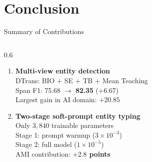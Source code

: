 \documentclass[aspectratio=169,10pt]{beamer}
\newcommand{\hg}[1]{\textcolor{dkgreen}{\textbf{#1}}}
\begin{document}
\section{Conclusion}

\begin{frame}{Summary of Contributions}
  \begin{columns}[T]
    \begin{column}{0.6\textwidth}
      \vspace{0.2em}
      \begin{enumerate}
        \setlength{\itemsep}{0.6em}
        \item \textbf{Multi-view entity detection}\\
          DTrans: BIO + SE + TB + Mean Teaching\\
          Span F1: 75.68 $\to$ \hg{82.35} ($+6.67$)\\
          Largest gain in AI domain: $+20.85$

        \item \textbf{Two-stage soft-prompt entity typing}\\
          Only $3{,}840$ trainable parameters\\
          Stage 1: prompt warmup ($3\times10^{-3}$)\\
          Stage 2: full model ($1\times10^{-5}$)\\
          AMI contribution: \hg{$+2.8$ points}


\end{enumerate}
\end{column}
\end{columns}
\end{frame}
\end{document}
